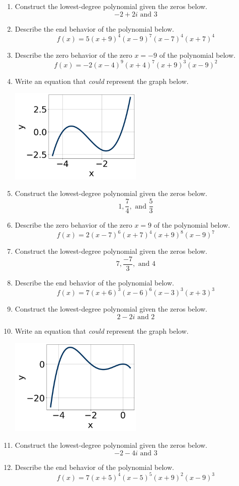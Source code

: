\documentclass[14pt]{extbook}
\begin{document}
\begin{enumerate}
{\begin{center}
\end{center}
} \newpage
\item{
Construct the lowest-degree polynomial given the zeros below.\[ -2 + 2 i \text{ and } 3 \]} \newpage
\item{
Describe the end behavior of the polynomial below.\[ f(x) = 5(x + 9)^{4}(x - 9)^{7}(x - 7)^{4}(x + 7)^{4} \]} \newpage
\item{
Describe the zero behavior of the zero $x = -9$ of the polynomial below.\[ f(x) = -2(x - 4)^{9}(x + 4)^{7}(x + 9)^{3}(x - 9)^{2} \]} \newpage
\item{
Write an equation that \textit{could} represent the graph below.
\begin{center}
    \includegraphics[width=0.5\textwidth]{../Figures/polyGraphToFunctionC.png}
\end{center}
} \newpage
\item{
Construct the lowest-degree polynomial given the zeros below.\[ 1, \frac{7}{4}, \text{ and } \frac{5}{3} \]} \newpage
\item{
Describe the zero behavior of the zero $x = 9$ of the polynomial below.\[ f(x) = 2(x - 7)^{6}(x + 7)^{4}(x + 9)^{8}(x - 9)^{7} \]} \newpage
\item{
Construct the lowest-degree polynomial given the zeros below.\[ 7, \frac{-7}{3}, \text{ and } 4 \]} \newpage
\item{
Describe the end behavior of the polynomial below.\[ f(x) = 7(x + 6)^{3}(x - 6)^{6}(x - 3)^{3}(x + 3)^{3} \]} \newpage
\item{
Construct the lowest-degree polynomial given the zeros below.\[ 2 - 2 i \text{ and } 2 \]} \newpage
\item{
Write an equation that \textit{could} represent the graph below.
\begin{center}
    \includegraphics[width=0.5\textwidth]{../Figures/polyGraphToFunctionCopyC.png}
\end{center}
} \newpage
\item{
Construct the lowest-degree polynomial given the zeros below.\[ -2 - 4 i \text{ and } 3 \]} \newpage
\item{
Describe the end behavior of the polynomial below.\[ f(x) = 7(x + 5)^{4}(x - 5)^{5}(x + 9)^{2}(x - 9)^{3} \]} \newpage
\end{enumerate}
\end{document}
